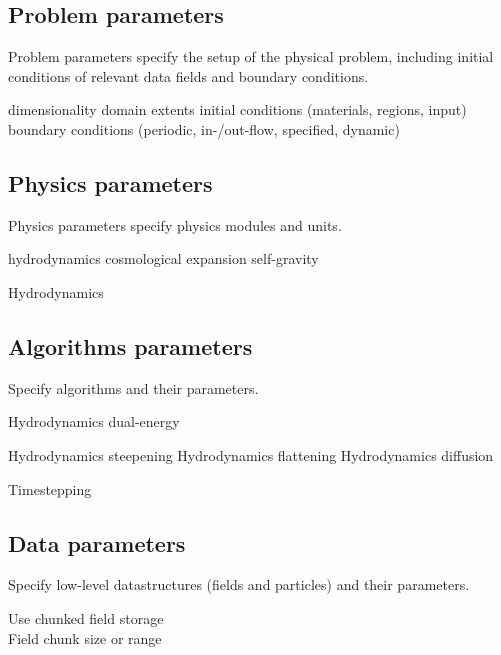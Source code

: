 \documentclass{article}
\begin{document}
\subsection{Problem parameters}

Problem parameters specify the setup of the physical problem,
including initial conditions of relevant data fields and boundary
conditions.

  dimensionality
  domain extents
  initial conditions (materials, regions, input)
 boundary conditions (periodic, in-/out-flow, specified, dynamic)

\subsection{Physics parameters}

Physics parameters specify physics modules and units.

 hydrodynamics
  cosmological expansion
 self-gravity

Hydrodynamics


\subsection{Algorithms parameters} 

Specify algorithms and their parameters.

Hydrodynamics dual-energy

Hydrodynamics steepening
Hydrodynamics flattening
Hydrodynamics diffusion

Timestepping

\subsection{Data parameters}

Specify low-level datastructures (fields and particles) and their
parameters.

Use chunked field storage \\
Field chunk size or range
\end{document}
